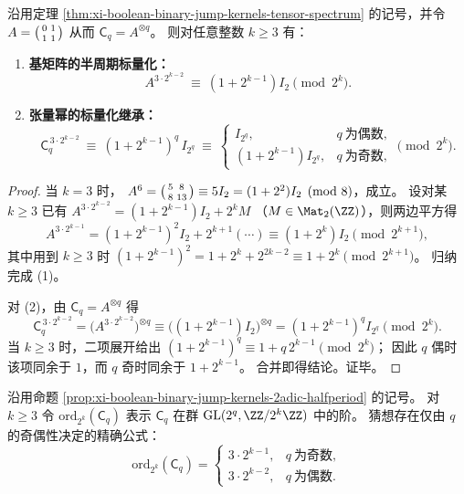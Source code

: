 \begin{proposition}[\(2\)-进半周期标量化与张量幂的同余坍塌]\label{prop:xi-boolean-binary-jump-kernels-2adic-halfperiod}
沿用定理 \ref{thm:xi-boolean-binary-jump-kernels-tensor-spectrum} 的记号，并令
\(
A=\begin{psmallmatrix}0&1\\[2pt]1&1\end{psmallmatrix}
\)
从而 \(\mathsf C_q=A^{\otimes q}\)。
则对任意整数 \(k\ge 3\) 有：
\begin{enumerate}
\normalfont
  \item \textbf{基矩阵的半周期标量化：}
  \[
  A^{3\cdot 2^{k-2}}\ \equiv\ (1+2^{k-1})I_2\pmod{2^k}.
  \]
  \item \textbf{张量幂的标量化继承：}
  \[
  \mathsf C_q^{\,3\cdot 2^{k-2}}
  \ \equiv\
  (1+2^{k-1})^q\,I_{2^q}
  \ \equiv\
  \begin{cases}
  I_{2^q},& q\ \text{为偶数},\\
  (1+2^{k-1})I_{2^q},& q\ \text{为奇数},
  \end{cases}
  \pmod{2^k}.
  \]
\end{enumerate}
\end{proposition}
\begin{proof}
当 \(k=3\) 时，
\(
A^6=\begin{psmallmatrix}5&8\\[2pt]8&13\end{psmallmatrix}\equiv 5I_2=(1+2^2)I_2\pmod 8
\)，成立。
设对某 \(k\ge 3\) 已有
\(
A^{3\cdot 2^{k-2}}=(1+2^{k-1})I_2+2^kM
\)
（\(M\in\Mat_2(\ZZ)\)），则两边平方得
\[
A^{3\cdot 2^{k-1}}
=(1+2^{k-1})^2I_2+2^{k+1}(\cdots)
\equiv (1+2^k)I_2\pmod{2^{k+1}},
\]
其中用到 \(k\ge 3\) 时 \((1+2^{k-1})^2=1+2^k+2^{2k-2}\equiv 1+2^k\pmod{2^{k+1}}\)。
归纳完成 (1)。
\par
对 (2)，由 \(\mathsf C_q=A^{\otimes q}\) 得
\[
\mathsf C_q^{\,3\cdot 2^{k-2}}=\bigl(A^{3\cdot 2^{k-2}}\bigr)^{\otimes q}
\equiv \bigl((1+2^{k-1})I_2\bigr)^{\otimes q}=(1+2^{k-1})^q I_{2^q}\pmod{2^k}.
\]
当 \(k\ge 3\) 时，二项展开给出
\(
(1+2^{k-1})^q\equiv 1+q\,2^{k-1}\pmod{2^k}
\)；
因此 \(q\) 偶时该项同余于 \(1\)，而 \(q\) 奇时同余于 \(1+2^{k-1}\)。
合并即得结论。证毕。
\end{proof}

\begin{conjecture}\label{conj:xi-boolean-binary-jump-kernels-2adic-order-parity}
沿用命题 \ref{prop:xi-boolean-binary-jump-kernels-2adic-halfperiod} 的记号。
对 \(k\ge 3\) 令 \(\mathrm{ord}_{2^k}(\mathsf C_q)\) 表示 \(\mathsf C_q\) 在群 \(\mathrm{GL}(2^q,\ZZ/2^k\ZZ)\) 中的阶。
猜想存在仅由 \(q\) 的奇偶性决定的精确公式：
\[
\mathrm{ord}_{2^k}(\mathsf C_q)=
\begin{cases}
3\cdot 2^{k-1},& q\ \text{为奇数},\\[2pt]
3\cdot 2^{k-2},& q\ \text{为偶数}.
\end{cases}
\]
\end{conjecture}

\endinput
